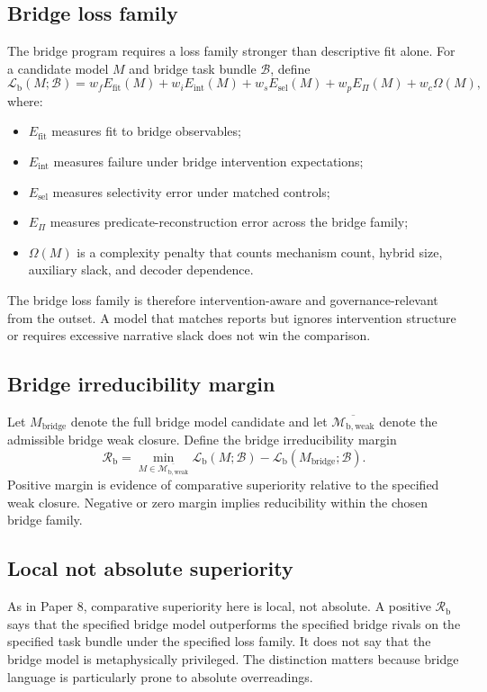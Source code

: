 \documentclass[11pt,a4paper]{article}
\theoremstyle{definition}
\newcommand{\BridgeWeakFam}{\mathcal{M}_{\mathrm{b,weak}}}
\newcommand{\BridgeWeakClosure}{\overline{\BridgeWeakFam}}
\newcommand{\BridgeLoss}{\mathcal{L}_{\mathrm{b}}}
\newcommand{\BridgeMargin}{\mathcal{R}_{\mathrm{b}}}
\begin{document}
\subsection{Bridge loss family}
The bridge program requires a loss family stronger than descriptive fit alone. For a candidate model $M$ and bridge task bundle $\mathcal{B}$, define
\[
\BridgeLoss(M;\mathcal{B})=
w_f E_{\mathrm{fit}}(M)
+w_i E_{\mathrm{int}}(M)
+w_s E_{\mathrm{sel}}(M)
+w_p E_{\Pi}(M)
+w_c \Omega(M),
\]
where:
\begin{itemize}[leftmargin=1.5em]
\item $E_{\mathrm{fit}}$ measures fit to bridge observables;
\item $E_{\mathrm{int}}$ measures failure under bridge intervention expectations;
\item $E_{\mathrm{sel}}$ measures selectivity error under matched controls;
\item $E_{\Pi}$ measures predicate-reconstruction error across the bridge family;
\item $\Omega(M)$ is a complexity penalty that counts mechanism count, hybrid size, auxiliary slack, and decoder dependence.
\end{itemize}
The bridge loss family is therefore intervention-aware and governance-relevant from the outset. A model that matches reports but ignores intervention structure or requires excessive narrative slack does not win the comparison.

\subsection{Bridge irreducibility margin}
Let $M_{\mathrm{bridge}}$ denote the full bridge model candidate and let $\BridgeWeakClosure$ denote the admissible bridge weak closure. Define the bridge irreducibility margin
\[
\BridgeMargin
=
\min_{M\in \BridgeWeakClosure}\BridgeLoss(M;\mathcal{B})
-
\BridgeLoss(M_{\mathrm{bridge}};\mathcal{B}).
\]
Positive margin is evidence of comparative superiority relative to the specified weak closure. Negative or zero margin implies reducibility within the chosen bridge family.

\subsection{Local not absolute superiority}
As in Paper 8, comparative superiority here is local, not absolute. A positive $\BridgeMargin$ says that the specified bridge model outperforms the specified bridge rivals on the specified task bundle under the specified loss family. It does not say that the bridge model is metaphysically privileged. The distinction matters because bridge language is particularly prone to absolute overreadings.
\end{document}
